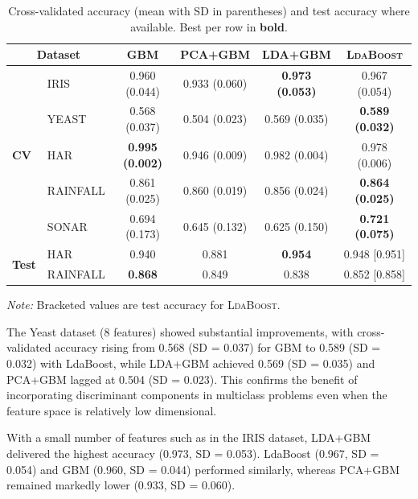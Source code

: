 \documentclass[11pt,a4paper]{article}
\begin{document}
{\begin{table}[h!]
\centering
\begingroup
\setlength{\tabcolsep}{5pt}
\renewcommand{\arraystretch}{1.0}
\footnotesize
\caption{Cross-validated accuracy (mean with SD in parentheses) and test accuracy where available.
Best per row in \textbf{bold}.}
\label{tab:classification_results_old}
\begin{tabular}{@{}llcccc@{}}
\toprule
\multicolumn{2}{c}{\textbf{Dataset}} & \textbf{GBM} & \textbf{PCA+GBM} & \textbf{LDA+GBM} & \textbf{\textsc{LdaBoost}} \\
\midrule
\multirow{5}{*}{\textbf{CV}}
    & IRIS      & 0.960 (0.044) & 0.933 (0.060) & \textbf{0.973 (0.053)} & 0.967 (0.054) \\
    & YEAST     & 0.568 (0.037) & 0.504 (0.023) & 0.569 (0.035) & \textbf{0.589 (0.032)} \\
    & HAR       & \textbf{0.995 (0.002)} & 0.946 (0.009) & 0.982 (0.004) & 0.978 (0.006) \\
    & RAINFALL      & 0.861 (0.025) & 0.860 (0.019) & 0.856 (0.024) & \textbf{0.864 (0.025)} \\
    & SONAR     & 0.694 (0.173) & 0.645 (0.132) & 0.625 (0.150) & \textbf{0.721 (0.075)} \\
\midrule
\multirow{2}{*}{\textbf{Test}}
    & HAR       & 0.940 & 0.881 & \textbf{0.954} & 0.948 [0.951] \\
    & RAINFALL      & \textbf{0.868} & 0.849 &  0.838 & 0.852 [0.858] \\
\bottomrule
\end{tabular}
\endgroup

\medskip
\raggedright\footnotesize
\textit{Note:} Bracketed values are test accuracy for \textsc{LdaBoost}.
\end{table}

\bigskip
\noindent
The Yeast dataset (8 features) showed substantial improvements, with cross-validated accuracy rising from 0.568 (SD = 0.037) for GBM to 0.589 (SD = 0.032) with LdaBoost, while LDA+GBM achieved 0.569 (SD = 0.035) and PCA+GBM lagged at 0.504 (SD = 0.023). This confirms the benefit of incorporating discriminant components in multiclass problems even when the feature space is relatively low dimensional.

With a small number of features such as in the IRIS dataset, LDA+GBM delivered the highest accuracy (0.973, SD = 0.053). LdaBoost (0.967, SD = 0.054) and GBM (0.960, SD = 0.044) performed similarly, whereas PCA+GBM remained markedly lower (0.933, SD = 0.060).

}
\end{document}
